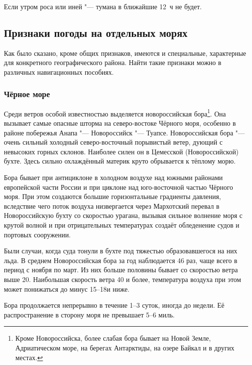  Если утром роса или иней "--- тумана в ближайшие 12~ч не будет.

\subsection{Признаки погоды на отдельных морях}

Как было сказано, кроме общих признаков, имеются и специальные,
характерные для конкретного географического района. Найти такие
признаки можно в различных навигационных пособиях.

\subsubsection{Чёрное море}

Среди ветров особой известностью выделяется новороссийская
бора\footnote{Кроме Новороссийска, более слабая бора бывает на Новой
  Земле, Адриатическом море, на берегах Антарктиды, на озере Байкал и
  в других местах.}. Она вызывает самые опасные шторма на
северо-востоке Чёрного моря, особенно в районе побережья Анапа "---
Новороссийск "--- Туапсе. Новороссийская бора "--- очень сильный
холодный северо-восточный порывистый ветер, дующий с невысоких горных
склонов. Наиболее силен он в Цемесской (Новороссийской) бухте. Здесь
сильно охлаждённый материк круто обрывается к тёплому морю.

Бора бывает при антициклоне в холодном воздухе над южными районами
европейской части России и при циклоне над юго-восточной частью
Чёрного моря. При этом создаются большие горизонтальные градиенты
давления, вследствие чего поток воздуха низвергается через Мархотский
перевал в Новороссийскую бухту со скоростью урагана, вызывая сильное
волнение моря с крутой волной и при отрицательных температурах создаёт
обледенение судов и портовых сооружении.

Были случаи, когда суда тонули в бухте под тяжестью образовавшегося на
них льда. В среднем Новороссийская бора за год наблюдается 46 раз,
чаще всего в период с ноября по март. Из них больше половины бывает со
скоростью ветра выше 20\speedms. Наибольшая скорость ветра 40\speedms
и более, температура воздуха при этом может понижаться до минус
15--18\grC и ниже.

Бора продолжается непрерывно в течение 1--3 суток, иногда до недели. Её
распространение в сторону моря не превышает 5--6 миль.

